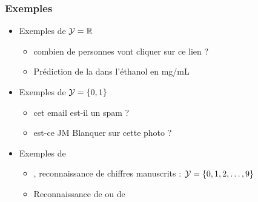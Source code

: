 \begin{frame}
  \frametitle{Exemples}
  \begin{itemize}
  \item Exemples de   $\mathcal{Y} = {\mathbb R}$ 
    \begin{itemize}
    \item {} combien de personnes vont cliquer sur ce lien ?
    \item Prédiction de la  dans l'éthanol en mg/mL
    \end{itemize}
  \pause
  \item Exemples de   $\mathcal{Y} = \{0, 1\}$
    \begin{itemize}
    \item {} cet email est-il un spam ?
    \item {} est-ce JM Blanquer sur cette photo ?
    \end{itemize}
  \pause
  \item Exemples de   
    \begin{itemize}
    \item {}, reconnaissance de chiffres manuscrits : $\mathcal{Y} = \{0, 1, 2, \dots, 9\}$
    \item Reconnaissance de  ou de 
    \end{itemize} 
  \end{itemize}
\end{frame}

